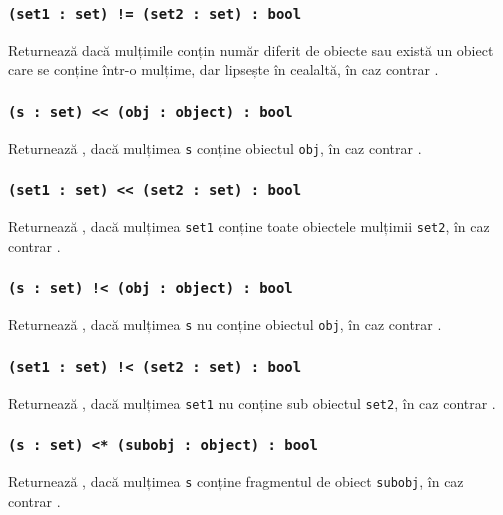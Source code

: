 \subsubsection{\texttt{(set1 : set) != (set2 : set) : bool}}

Returnează \true{} dacă mulțimile conțin număr diferit de obiecte sau există un obiect care se conține într-o mulțime, dar lipsește în cealaltă, în caz contrar \false{}.

\subsubsection{\texttt{(s : set) << (obj : object) : bool}}

Returnează \true{}, dacă mulțimea \texttt{s} conține obiectul \texttt{obj}, în caz contrar \false{}.

\subsubsection{\texttt{(set1 : set) << (set2 : set) : bool}}

Returnează \true, dacă mulțimea \texttt{set1} conține toate obiectele mulțimii \texttt{set2}, în caz contrar \false.

\subsubsection{\texttt{(s : set) !< (obj : object) : bool}}

Returnează \true{}, dacă mulțimea \texttt{s} nu conține obiectul \texttt{obj}, în caz contrar \false{}.

\subsubsection{\texttt{(set1 : set) !< (set2 : set) : bool}}

Returnează \true, dacă mulțimea \texttt{set1} nu conține sub obiectul \texttt{set2}, în caz contrar \false.

\subsubsection{\texttt{(s : set) <* (subobj : object) : bool}}

Returnează \true{}, dacă mulțimea \texttt{s} conține fragmentul de obiect \texttt{subobj}, în caz contrar \false{}.

